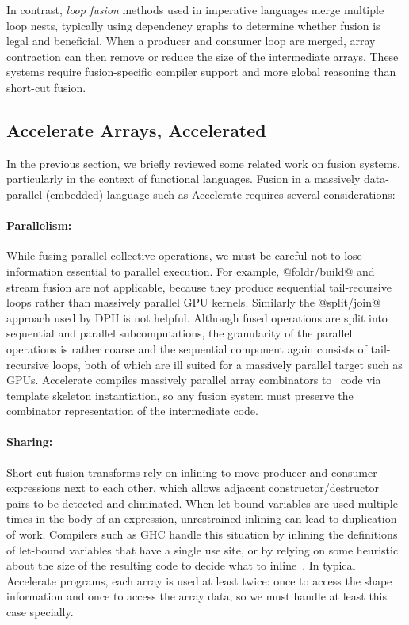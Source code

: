 In contrast, \emph{loop fusion} methods used in imperative
languages merge multiple loop nests, typically using dependency
graphs to determine whether fusion is legal and beneficial.
When a producer and consumer loop are merged, array
contraction can then remove or reduce the size of the
intermediate arrays. These systems require fusion-specific compiler support and
more global reasoning than short-cut fusion.


\subsection{Accelerate Arrays, Accelerated}

In the previous section, we briefly reviewed some related work on fusion
systems, particularly in the context of functional languages. Fusion in a
massively data-parallel (embedded) language such as Accelerate requires several
considerations:

\paragraph{Parallelism:} While fusing parallel collective operations, we must be
careful not to lose information essential to parallel execution. For example,
@foldr/build@ and stream
fusion are not applicable, because they produce sequential tail-recursive loops
rather than massively parallel GPU kernels. Similarly the
@split/join@ approach used by
DPH is not helpful. Although fused operations are
split into sequential and parallel subcomputations, the granularity of the
parallel operations is rather coarse and the sequential component again consists
of tail-recursive loops, both of which are ill suited for a massively parallel
target such as GPUs. Accelerate compiles
massively parallel array combinators to \CUDA\ code via template skeleton
instantiation, so any fusion system must preserve the combinator representation
of the intermediate code.

\paragraph{Sharing:} Short-cut fusion transforms rely on
inlining to move producer and consumer expressions next to each other, which
allows adjacent constructor/destructor pairs to be detected and eliminated. When
let-bound variables are used multiple times in the body of an expression,
unrestrained inlining can lead to duplication of work. Compilers such as GHC
handle this situation by inlining the definitions of let-bound variables that
have a single use site, or by relying on some heuristic about the size of the
resulting code to decide what to inline~\cite{PeytonJones:2003gb}. In typical
Accelerate programs, each array is used at least twice: once to access the shape
information and once to access the array data, so we must handle at least this
case specially.

